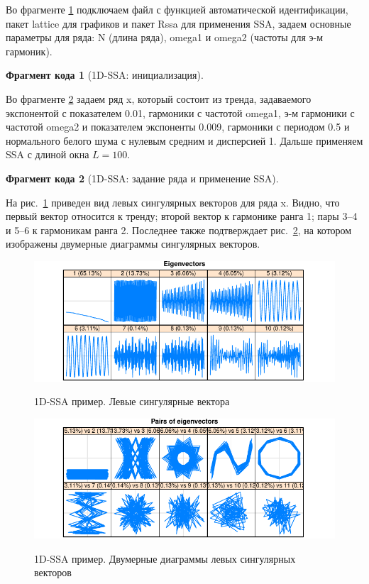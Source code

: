 \documentclass[specialist,
               substylefile = spbu.rtx,
               subf,href,colorlinks=true, 12pt]{disser}
\newtheorem{fragment}{Фрагмент кода}[section]
\newcommand{\bfgh}{\begin{figure}[!htbp]}
\newcommand{\efg}{\end{figure}}
\begin{document}
Во фрагменте \ref{frag:1dssa_init} подключаем файл с функцией автоматической идентификации, пакет lattice для графиков и пакет Rssa для применения SSA, задаем основные параметры для ряда: N (длина ряда), omega1 и omega2 (частоты для э-м гармоник).
\begin{fragment}[1D-SSA: инициализация]
\label{frag:1dssa_init}

\end{fragment}
Во фрагменте \ref{frag:1dssa_series} задаем ряд x, который состоит из тренда, задаваемого экспонентой с показателем 0.01, гармоники с частотой omega1, э-м гармоники с частотой omega2 и показателем экспоненты 0.009, гармоники с периодом 0.5 и нормального белого шума с нулевым средним и дисперсией 1.
Дальше применяем SSA с длиной окна $L=100$.
\begin{fragment}[1D-SSA: задание ряда и применение SSA]
\label{frag:1dssa_series}

\end{fragment}
На рис.~\ref{fig:1dssa_vectors} приведен вид левых сингулярных векторов для ряда x. Видно, что первый вектор относится к тренду; второй вектор к гармонике ранга 1; пары 3--4 и 5--6 к гармоникам ранга 2. Последнее также подтверждает рис.~\ref{fig:1dssa_vectors_pair}, на котором изображены двумерные диаграммы сингулярных векторов.
\bfgh
        \begin{center}
{\includegraphics[width=4.5in]{1dssa_vectors}}
        \end{center}
        \caption{1D-SSA пример. Левые сингулярные вектора}
        \label{fig:1dssa_vectors}
\efg
\bfgh
        \begin{center}
{\includegraphics[width=4.5in]{1dssa_vectors_pair}}
        \end{center}
        \caption{1D-SSA пример. Двумерные диаграммы левых сингулярных векторов}
        \label{fig:1dssa_vectors_pair}
\efg
\end{document}
